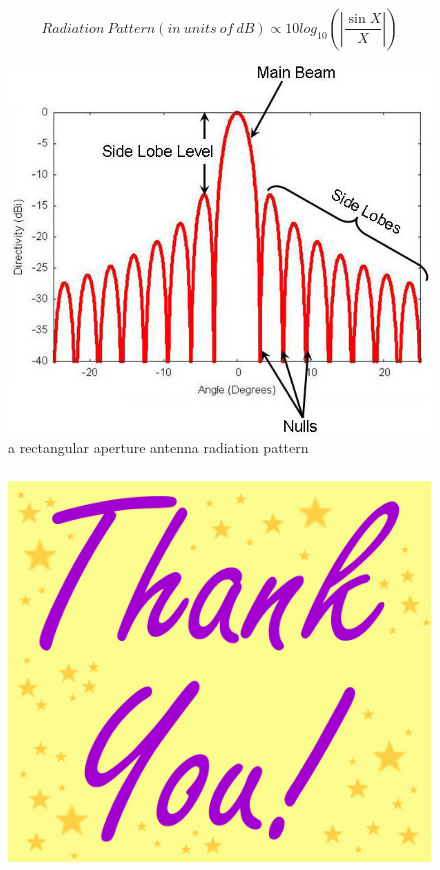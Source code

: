 \documentclass[compress=true]{beamer}
\begin{document}
\begin{frame}
  \frametitle{}
\begin{block}{}
$$Radiation~Pattern(in~units~of~dB)\propto 10log_{10}(|\frac{\sin X}{X}|)$$
\end{block}
  \begin{figure}
    \includegraphics[height=0.7\textheight]{sinc.jpg}
    \caption*{\tiny{a rectangular aperture antenna radiation pattern}}
  \end{figure}
\end{frame}
\begin{frame}
  \frametitle{}
  \begin{figure}
    \includegraphics[height=0.8\textheight]{Thank_You.jpg}
  \end{figure}
\end{frame}
\end{document}

